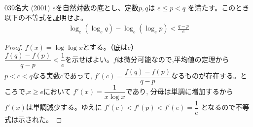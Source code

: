 \begin{thm}{039}{}{名大 (2001)}
 $e$を自然対数の底とし、定数$p,q$は $e\le p<q$ を満たす。このとき以下の不等式を証明せよ。
 \begin{align*}
  \log_e\left(\log_e q\right) - \log_e\left(\log_e p\right) < \frac{q-p}{e}
 \end{align*}
\end{thm}

\begin{proof}
$f(x)=\log{\log{x}}$とする。（底は$e$）\\
$\dfrac{f(q)-f(p)}{q-p}<\dfrac{1}{e}$を示せばよい。$f$は微分可能なので,平均値の定理から$p<c<q$なる実数$c$であって, $f'(c)=\dfrac{f(q)-f(p)}{q-p}$なるものが存在する。ところで,$x\geq e$において $f'(x)=\dfrac{1}{x\log{x}}$であり, 分母は単調に増加するから$f'(x)$は単調減少する。ゆえに $f'(c)<f'(p)<f'(e)=\dfrac{1}{e}$ となるので不等式は示された。
\end{proof}
